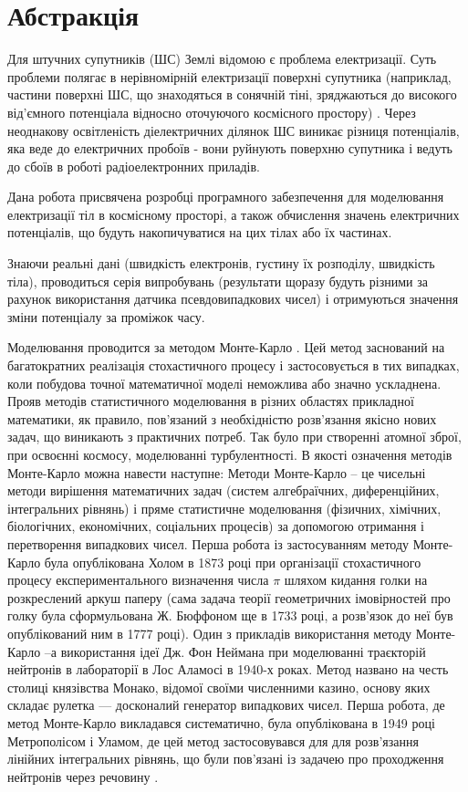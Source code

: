 \documentclass[a4paper,12pt]{article}
\begin{document}
\section{Абстракція}
Для штучних супутників (ШС) Землі відомою є проблема електризації. Суть проблеми полягає в нерівномірній електризації поверхні супутника (наприклад, частини поверхні ШС, що знаходяться в сонячній тіні, зряджаються до високого від’ємного потенціала відносно оточуючого космісного простору) \cite{report1}. Через неоднакову освітленість діелектричних ділянок ШС виникає різниця потенціалів, яка веде до електричних пробоїв - вони руйнують поверхню супутника і ведуть до сбоїв в роботі радіоелектронних приладів.

Дана робота присвячена розробці програмного забезпечення для моделювання електризації тіл в космісному просторі, а також обчислення значень електричних потенціалів, що будуть накопичуватися на цих тілах або їх частинах.

Знаючи реальні дані (швидкість електронів, густину їх розподілу, швидкість тіла), проводиться серія випробувань (результати щоразу будуть різними за рахунок використання датчика псевдовипадкових чисел) і отримуються значення зміни потенціалу за проміжок часу.

Моделювання проводится за методом Монте-Карло \cite{report2}. Цей метод заснований на багатократних реалізація стохастичного процесу і застосовується в тих випадках, коли побудова точної математичної моделі неможлива або значно ускладнена. Прояв методів статистичного моделювання в різних областях прикладної математики, як правило, пов’язаний з необхідністю розв’язання якісно нових задач, що виникають з практичних потреб. Так було при створенні атомної зброї, при освоєнні космосу, моделюванні турбулентності. В якості означення методів Монте-Карло можна навести наступне:
Методи Монте-Карло -- це чисельні методи вирішення математичних задач (систем алгебраїчних, диференційних, інтегральних рівнянь) і пряме статистичне моделювання (фізичних, хімічних, біологічних, економічних, соціальних процесів) за допомогою отримання і перетворення випадкових чисел. Перша робота із застосуванням методу Монте-Карло була опублікована Холом в 1873 році при організації стохастичного процесу експериментального визначення числа $\pi$ шляхом кидання голки на розкреслений аркуш паперу (сама задача теорії геометричних імовірностей про голку була сформульована Ж. Бюффоном ще в 1733 році, а розв’язок до неї був опублікований ним в 1777 році). Один з прикладів використання методу Монте-Карло --а використання ідеї Дж. Фон Неймана при моделюванні траєкторій нейтронів в лабораторії в Лос Аламосі в 1940-х роках. Метод названо на честь столиці князівства Монако, відомої своїми численними  казино, основу яких складає рулетка — досконалий генератор випадкових чисел. Перша робота, де метод Монте-Карло викладався систематично, була опублікована в 1949 році Метрополісом і Уламом, де цей метод застосовувався для для розв’язання лінійних інтегральних рівнянь, що були пов’язані із задачею про проходження нейтронів через речовину \cite{report3}.
\end{document}
